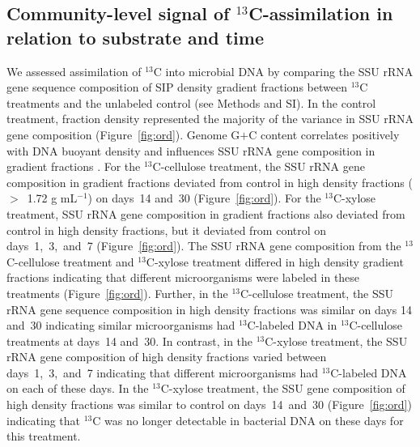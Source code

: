 \subsection{Community-level signal of $^{13}$C-assimilation in relation to substrate and time}
We assessed assimilation of $^{13}$C into microbial DNA by comparing the SSU
rRNA gene sequence composition of SIP density gradient fractions between
$^{13}$C treatments and the unlabeled control (see Methods and SI). In the
control treatment, fraction density represented the majority of the variance in
SSU rRNA gene composition (Figure~\ref{fig:ord}). Genome G$+$C content
correlates positively with DNA buoyant density and influences SSU rRNA gene
composition in gradient fractions \citep{Buckley_2007}. For the
$^{13}$C-cellulose treatment, the SSU rRNA gene composition in gradient
fractions deviated from control in high density fractions ($>$~1.72 g
mL$^{-1}$) on days~14 and~30 (Figure~\ref{fig:ord}). For the $^{13}$C-xylose
treatment, SSU rRNA gene composition in gradient fractions also deviated from
control in high density fractions, but it deviated from control on
days~1,~3,~and~7 (Figure~\ref{fig:ord}). The SSU rRNA gene composition from the
$^{13}$C-cellulose treatment and $^{13}$C-xylose treatment differed in high density
gradient fractions indicating that different microorganisms were labeled in these
treatments (Figure~\ref{fig:ord}). Further, in the
$^{13}$C-cellulose treatment, the SSU rRNA gene sequence composition in high
density fractions was similar on days 14 and~30 indicating similar
microorganisms had $^{13}$C-labeled DNA in $^{13}$C-cellulose treatments at
days~14 and~30. In contrast, in the $^{13}$C-xylose treatment, the SSU rRNA
gene composition of high density fractions varied between days~1,~3,~and~7
indicating that different microorganisms had $^{13}$C-labeled DNA on each of these
days. In the $^{13}$C-xylose treatment, the SSU gene composition of high
density fractions was similar to control on days~14~and~30
(Figure~\ref{fig:ord}) indicating that $^{13}$C was no longer detectable in
bacterial DNA on these days for this treatment. 

